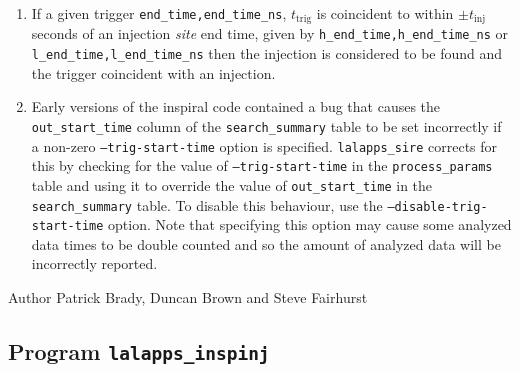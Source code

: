 \begin{entry}
\begin{enumerate}
\item If a given trigger \verb$end_time,end_time_ns$, $t_\mathrm{trig}$ is
coincident to within $\pm t_\mathrm{inj}$ seconds of an injection \emph{site}
end time, given by \verb$h_end_time,h_end_time_ns$ or
\verb$l_end_time,l_end_time_ns$ then the injection is considered to be found
and the trigger coincident with an injection.

\item Early versions of the inspiral code contained a bug that causes the
\verb$out_start_time$ column of the \verb$search_summary$ table to be set
incorrectly if a non-zero \texttt{--trig-start-time} option is specified.
\verb$lalapps_sire$ corrects for this by checking for the value of
\texttt{--trig-start-time} in the \verb$process_params$ table and using it to
override the value of \verb$out_start_time$ in the \verb$search_summary$
table. To disable this behaviour, use the \texttt{--disable-trig-start-time}
option. Note that specifying this option may cause some analyzed data times to
be double counted and so the amount of analyzed data will be incorrectly
reported.
\end{enumerate}

\item[Author] 
Patrick Brady, Duncan Brown and Steve Fairhurst
\end{entry}


\clearpage
\subsection{Program \texttt{lalapps\_inspinj}}
\label{program:lalapps-inspinj}

